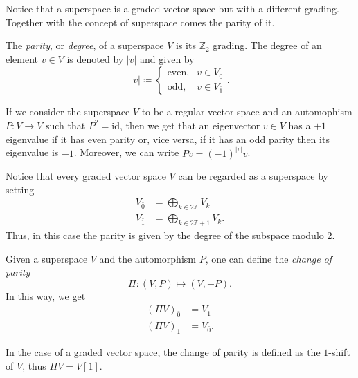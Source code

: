 Notice that a superspace is a graded vector space but with a different grading.
Together with the concept of superspace comes the parity of it.

\begin{definition}
    The \emph{parity}, or \emph{degree}, of a superspace $V$ is its $\mathbb{Z}_2$ grading.
    The degree of an element $v \in V$ is denoted by $|v|$ and given by
    \begin{equation*}
        |v| \coloneqq
        \begin{cases}
            \text{even}, &v \in V_{\bar{0}} \\
            \text{odd},  &v \in V_{\bar{1}}
        \end{cases}.
    \end{equation*}
\end{definition}

If we consider the superspace $V$ to be a regular vector space and an automophism $P: V \rightarrow V$ such that $P^2 = \text{id}$, then we get that an eigenvector $v \in V$ has a $+1$ eigenvalue if it has even parity or, vice versa, if it has an odd parity then its eigenvalue is $-1$.
Moreover, we can write $P v = (-1)^{|v|}v$.

Notice that every graded vector space $V$ can be regarded as a superspace by setting
\begin{align*}
    V_{\bar{0}} &= \bigoplus_{k \in 2 \mathbb{Z}} V_k \\
    V_{\bar{1}} &= \bigoplus_{k \in 2 \mathbb{Z} + 1} V_k .
\end{align*}
Thus, in this case the parity is given by the degree of the subspace modulo 2.

Given a superspace $V$ and the automorphism $P$, one can define the \emph{change of parity}
\begin{equation*}
    \Pi : (V, P) \mapsto (V, -P) .
\end{equation*}
In this way, we get
\begin{align*}
    (\Pi V)_{\bar{0}} &= V_{\bar{1}} \\
    (\Pi V)_{\bar{1}} &= V_{\bar{0}} .
\end{align*}

In the case of a graded vector space, the change of parity is defined as the $1$-shift of $V$, thus $\Pi V= V[1]$.

